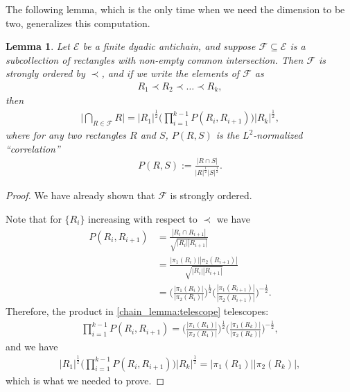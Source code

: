 \documentclass[oneside]{amsart}
\newtheorem{lemma}[theorem]{Lemma}
\theoremstyle{definition}
\theoremstyle{plain}
\numberwithin{equation}{section}
\numberwithin{theorem}{section}
\begin{document}
The following lemma, which is the only time when we need the dimension to be
two, generalizes this computation.
\begin{lemma} \label{chain_lemma}
  Let $\mathcal{E}$ be a finite dyadic antichain, and suppose $\mathcal{F}
  \subseteq \mathcal{E}$ is a subcollection of rectangles with
  non-empty common intersection.
  Then $\mathcal{F}$ is strongly ordered by $\prec$,
  and if we write the elements of $\mathcal{F}$ as
  \begin{align*}
    R_1 \prec R_2 \prec \dots \prec R_k,
  \end{align*}
  then
  \begin{align} \label{chain_lemma:telescope}
    \Bigg|\bigcap_{R \in \mathcal{F}} R \Bigg| = |R_1|^{\frac{1}{2}} \Bigg(
      \prod_{i=1}^{k-1} P(R_i, R_{i+1})
    \Bigg) |R_k|^{\frac{1}{2}},
  \end{align}
  where for any two rectangles $R$ and $S$, $P(R,S)$ is the $L^2$-normalized
  ``correlation''
  \begin{align*}
    P(R,S) := \frac{|R \cap S|}{|R|^{\frac{1}{2}} |S|^{\frac{1}{2}}}.
  \end{align*}
\end{lemma}
\begin{proof}
  We have already shown that $\mathcal{F}$ is strongly ordered.

  Note that for $\{R_i\}$ increasing with respect to $\prec$ we have
  \begin{align*}
    P(R_i, R_{i+1}) &= \frac{|R_i \cap R_{i+1}|}{\sqrt{|R_i| |R_{i+1}|}} \\
    &= \frac{|\pi_1(R_i)| |\pi_2(R_{i+1})|}{\sqrt{|R_i| |R_{i+1}|}} \\
    &= \bigg(\frac{|\pi_1(R_i)|}{|\pi_2(R_i)|}\bigg)^{\frac{1}{2}}
       \bigg(\frac{|\pi_1(R_{i+1})|}{|\pi_2(R_{i+1})|}\bigg)^{-\frac{1}{2}}.
  \end{align*}
  Therefore, the product in \eqref{chain_lemma:telescope} telescopes:
  \begin{align*}
    \prod_{i=1}^{k-1} P(R_i, R_{i+1}) =
      \bigg(\frac{|\pi_1(R_1)|}{|\pi_2(R_1)|}\bigg)^{\frac{1}{2}}
      \bigg(\frac{|\pi_1(R_k)|}{|\pi_2(R_k)|}\bigg)^{-\frac{1}{2}},
  \end{align*}
  and we have
  \begin{align*}
    |R_1|^{\frac{1}{2}} \Bigg(
      \prod_{i=1}^{k-1} P(R_i, R_{i+1})
    \Bigg) |R_k|^{\frac{1}{2}} = |\pi_1(R_1)||\pi_2(R_k)|,
  \end{align*}
  which is what we needed to prove.
\end{proof}
\end{document}
